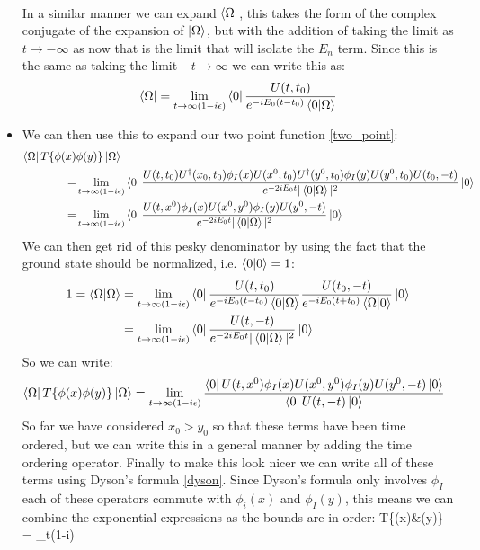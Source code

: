 \documentclass[11pt]{article}
\renewenvironment{flalign}{\vspace{-2mm}\empheq[box=\tcbhighmath]{align}}{\endempheq}
\numberwithin{equation}{section}
\begin{document}
\begin{itemize}
\begin{align*}
  \end{align*}
  In a similar manner we can expand $\bra{\Omega}$, this takes the form of the complex conjugate of the expansion of $\ket{\Omega}$, but with the addition of taking the limit as $t \rightarrow -\infty$ as now that is the limit that will isolate the $E_n$ term. Since this is the same as taking the limit $-t\rightarrow \infty$ we can write this as:
  \begin{align*}
    \bra{\Omega}=\lim_{t\rightarrow\infty(1-i\epsilon)}\bra{0}\frac{U(t,t_0)}{e^{-iE_0(t-t_0)}\braket{0|\Omega}}
  \end{align*}
  \item We can then use this to expand our two point function \ref{two_point}:
  \begin{align*}
     \bra{\Omega}T\{\phi(x)&\phi(y)\}\ket{\Omega} \\
      = & \lim_{t\rightarrow\infty(1-i\epsilon)}\bra{0}\frac{U(t,t_0)U^{\dagger}(x_0,t_0)\phi_I(x)U(x^0,t_0)U^{\dagger}(y^0,t_0)\phi_I(y)U(y^0,t_0)U(t_0,-t)}{e^{-2iE_0t}|\braket{0|\Omega}|^2}\ket{0} \\
      = & \lim_{t\rightarrow\infty(1-i\epsilon)}\bra{0}\frac{U(t,x^0)\phi_I(x)U(x^0,y^0)\phi_I(y)U(y^0,-t)}{e^{-2iE_0t}|\braket{0|\Omega}|^2}\ket{0}
  \end{align*}
  We can then get rid of this pesky denominator by using the fact that the ground state should be normalized, i.e. $\braket{0|0}=1$:
  \begin{align*}
    1= \braket{\Omega|\Omega} &= \lim_{t\rightarrow\infty(1-i\epsilon)}\bra{0}\frac{U(t,t_0)}{e^{-iE_0(t-t_0)}\braket{0|\Omega}}\frac{U(t_0,-t)}{e^{-iE_0(t+t_0)}\braket{\Omega|0}}\ket{0} \\
    & = \lim_{t\rightarrow\infty(1-i\epsilon)}\bra{0}\frac{U(t,-t)}{e^{-2iE_0t}|\braket{0|\Omega}|^2}\ket{0}
  \end{align*}
  So we can write:
  \begin{align*}
    \bra{\Omega}T\{\phi(x)&\phi(y)\}\ket{\Omega} = \lim_{t\rightarrow\infty(1-i\epsilon)}\frac{\bra{0}U(t,x^0)\phi_I(x)U(x^0,y^0)\phi_I(y)U(y^0,-t)\ket{0}}{\bra{0}U(t,-t)\ket{0}}
  \end{align*}
  So far we have considered $x_0>y_0$ so that these terms have been time ordered, but we can write this in a general manner by adding the time ordering operator. Finally to make this look nicer we can write all of these terms using Dyson's formula \ref{dyson}. Since Dyson's formula only involves $\phi_I$ each of these operators commute with $\phi_i(x)$ and $\phi_I(y)$, this means we can combine the exponential expressions as the bounds are in order:  
    \begin{flalign}
    \label{2_point_inter}
    \bra{\Omega}T\{\phi(x)&\phi(y)\}\ket{\Omega} = \lim_{t\rightarrow\infty(1-i\epsilon)}
  \end{flalign}
\end{itemize}
\end{document}
